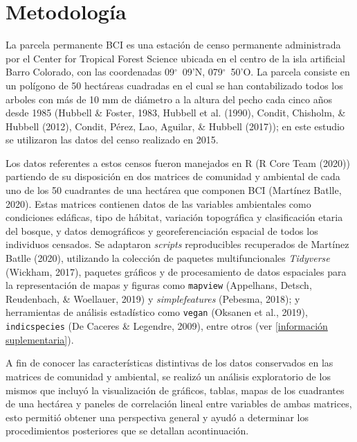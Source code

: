 \documentclass[11pt,]{article}
\begin{document}
\section{Metodología}\label{metodologuxeda}

La parcela permanente BCI es una estación de censo permanente
administrada por el Center for Tropical Forest Science ubicada en el
centro de la isla artificial Barro Colorado, con las coordenadas
09\(^\circ\)~09'N, 079\(^\circ\)~50'O. La parcela consiste en un
polígono de 50 hectáreas cuadradas en el cual se han contabilizado todos
los arboles con más de 10 mm de diámetro a la altura del pecho cada
cinco años desde 1985 (Hubbell \& Foster, 1983, Hubbell et al. (1990),
Condit, Chisholm, \& Hubbell (2012), Condit, Pérez, Lao, Aguilar, \&
Hubbell (2017)); en este estudio se utilizaron las datos del censo
realizado en 2015.

Los datos referentes a estos censos fueron manejados en R (R Core Team
(2020)) partiendo de su disposición en dos matrices de comunidad y
ambiental de cada uno de los 50 cuadrantes de una hectárea que componen
BCI (Martínez Batlle, 2020). Estas matrices contienen datos de las
variables ambientales como condiciones edáficas, tipo de hábitat,
variación topográfica y clasificación etaria del bosque, y datos
demográficos y georeferenciación espacial de todos los individuos
censados. Se adaptaron \emph{scripts} reproducibles recuperados de
Martínez Batlle (2020), utilizando la colección de paquetes
multifuncionales \emph{Tidyverse} (Wickham, 2017), paquetes gráficos y
de procesamiento de datos espaciales para la representación de mapas y
figuras como \texttt{mapview} (Appelhans, Detsch, Reudenbach, \&
Woellauer, 2019) y \emph{simplefeatures} (Pebesma, 2018); y herramientas
de análisis estadístico como \texttt{vegan} (Oksanen et al., 2019),
\texttt{indicspecies} (De Caceres \& Legendre, 2009), entre otros (ver
\ref{información suplementaria}).

A fin de conocer las características distintivas de los datos
conservados en las matrices de comunidad y ambiental, se realizó un
análisis exploratorio de los mismos que incluyó la visualización de
gráficos, tablas, mapas de los cuadrantes de una hectárea y paneles de
correlación lineal entre variables de ambas matrices, esto permitió
obtener una perspectiva general y ayudó a determinar los procedimientos
posteriores que se detallan acontinuación.
\end{document}
